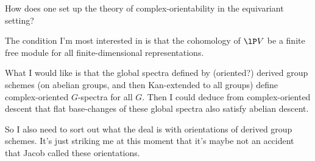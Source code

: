 \begin{idea}
\item How does one set up the theory of complex-orientability in the
  equivariant setting?


  \begin{idea}
  \item The condition I'm most interested in is that the cohomology of
    $\lP V$ be a finite free module for all finite-dimensional
    representations.
  \item What I would like is that the global spectra defined by
    (oriented?) derived group schemes (on abelian groups, and then
    Kan-extended to all groups) define complex-oriented $G$-spectra
    for all $G$. Then I could deduce from complex-oriented descent
    that flat base-changes of these global spectra also satisfy
    abelian descent.
  \item So I also need to sort out what the deal is with orientations
    of derived group schemes. It's just striking me at this moment
    that it's maybe not an accident that Jacob called these
    orientations.
  \end{idea}


\end{idea}




